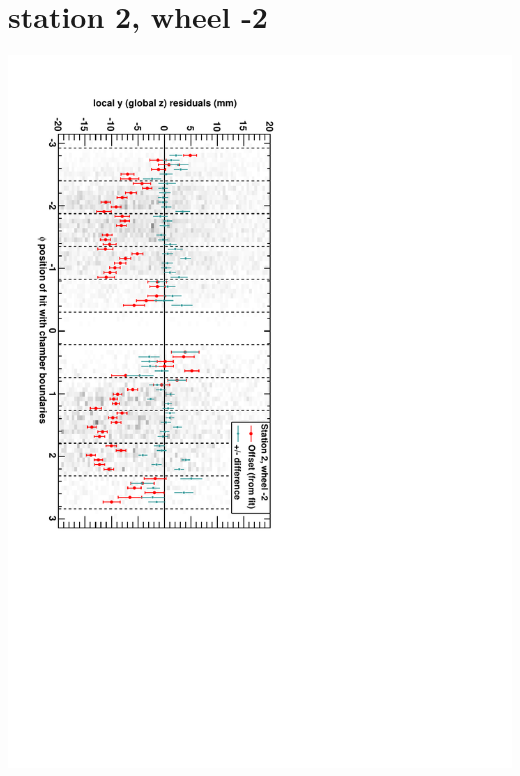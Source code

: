 \documentclass[compress]{beamer}
\begin{document}
\section*{station 2, wheel -2}
\begin{frame} \vfill \mbox{\hspace{-1 cm}\includegraphics[height=1.2\linewidth, angle=90]{DTzVsPhi_st2_whA.pdf}} \end{frame}
\end{document}
